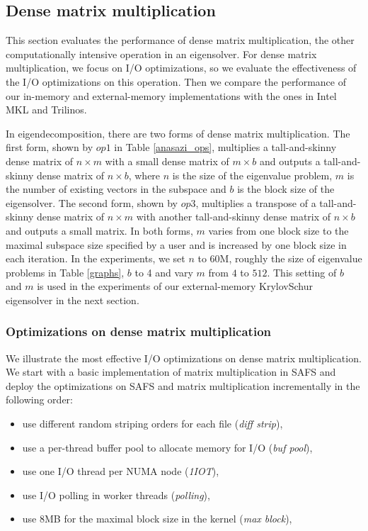 \subsection{Dense matrix multiplication}

This section evaluates the performance of dense matrix multiplication,
the other computationally intensive operation in an eigensolver.
For dense matrix multiplication, we focus on I/O optimizations, so we evaluate
the effectiveness of the I/O optimizations on this operation. Then we
compare the performance of our in-memory and external-memory
implementations with the ones in Intel MKL and Trilinos.

In eigendecomposition, there are two forms of dense matrix multiplication.
The first form, shown by $op1$ in Table \ref{anasazi_ops}, multiplies
a tall-and-skinny dense matrix of $n \times m$
with a small dense matrix of $m \times b$ and outputs a tall-and-skinny dense
matrix of $n \times b$, where $n$ is the size of the eigenvalue problem,
$m$ is the number of existing vectors in the subspace and $b$ is the block
size of the eigensolver. The second form, shown by $op3$, multiplies
a transpose of a tall-and-skinny dense matrix of $n \times m$ with another
tall-and-skinny dense matrix of $n \times b$ and outputs a small matrix.
In both forms, $m$ varies from one block size to the maximal subspace size
specified by a user and is increased by one block size in each
iteration. In the experiments, we set $n$ to 60M, roughly the size of
eigenvalue problems in Table \ref{graphs}, $b$ to 4 and vary $m$
from $4$ to $512$. This setting of $b$ and $m$ is used in the experiments
of our external-memory KrylovSchur eigensolver in the next section.

\subsubsection{Optimizations on dense matrix multiplication}

We illustrate the most effective I/O optimizations on dense matrix
multiplication. We start with a basic implementation of matrix multiplication
in SAFS and deploy the optimizations on SAFS and matrix multiplication
incrementally in the following order:
\begin{itemize} \itemsep1pt \parskip0pt 
	\item use different random striping orders for each file (\textit{diff strip}),
	\item use a per-thread buffer pool to allocate memory for I/O (\textit{buf pool}),
	\item use one I/O thread per NUMA node (\textit{1IOT}),
	\item use I/O polling in worker threads (\textit{polling}),
	\item use 8MB for the maximal block size in the kernel (\textit{max block}),
\end{itemize}

